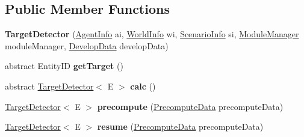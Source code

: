 \subsection*{Public Member Functions}
\begin{DoxyCompactItemize}
\item 
\hypertarget{classadf_1_1component_1_1module_1_1complex_1_1TargetDetector_aa85f9c037c852a920c96359ff9a7d870}{}\label{classadf_1_1component_1_1module_1_1complex_1_1TargetDetector_aa85f9c037c852a920c96359ff9a7d870} 
{\bfseries Target\+Detector} (\hyperlink{classadf_1_1agent_1_1info_1_1AgentInfo}{Agent\+Info} ai, \hyperlink{classadf_1_1agent_1_1info_1_1WorldInfo}{World\+Info} wi, \hyperlink{classadf_1_1agent_1_1info_1_1ScenarioInfo}{Scenario\+Info} si, \hyperlink{classadf_1_1agent_1_1module_1_1ModuleManager}{Module\+Manager} module\+Manager, \hyperlink{classadf_1_1agent_1_1develop_1_1DevelopData}{Develop\+Data} develop\+Data)
\item 
\hypertarget{classadf_1_1component_1_1module_1_1complex_1_1TargetDetector_a98b71b2e4c4e1107ac43a1d644dc4de8}{}\label{classadf_1_1component_1_1module_1_1complex_1_1TargetDetector_a98b71b2e4c4e1107ac43a1d644dc4de8} 
abstract Entity\+ID {\bfseries get\+Target} ()
\item 
\hypertarget{classadf_1_1component_1_1module_1_1complex_1_1TargetDetector_a6c809f961782b7ee5a56713d72e41776}{}\label{classadf_1_1component_1_1module_1_1complex_1_1TargetDetector_a6c809f961782b7ee5a56713d72e41776} 
abstract \hyperlink{classadf_1_1component_1_1module_1_1complex_1_1TargetDetector}{Target\+Detector}$<$ E $>$ {\bfseries calc} ()
\item 
\hypertarget{classadf_1_1component_1_1module_1_1complex_1_1TargetDetector_ad8620d626ba9f80585139df86e88c2b5}{}\label{classadf_1_1component_1_1module_1_1complex_1_1TargetDetector_ad8620d626ba9f80585139df86e88c2b5} 
\hyperlink{classadf_1_1component_1_1module_1_1complex_1_1TargetDetector}{Target\+Detector}$<$ E $>$ {\bfseries precompute} (\hyperlink{classadf_1_1agent_1_1precompute_1_1PrecomputeData}{Precompute\+Data} precompute\+Data)
\item 
\hypertarget{classadf_1_1component_1_1module_1_1complex_1_1TargetDetector_aca939c087c98e7b3d8a107633af0b095}{}\label{classadf_1_1component_1_1module_1_1complex_1_1TargetDetector_aca939c087c98e7b3d8a107633af0b095} 
\hyperlink{classadf_1_1component_1_1module_1_1complex_1_1TargetDetector}{Target\+Detector}$<$ E $>$ {\bfseries resume} (\hyperlink{classadf_1_1agent_1_1precompute_1_1PrecomputeData}{Precompute\+Data} precompute\+Data)

\end{DoxyCompactItemize}
